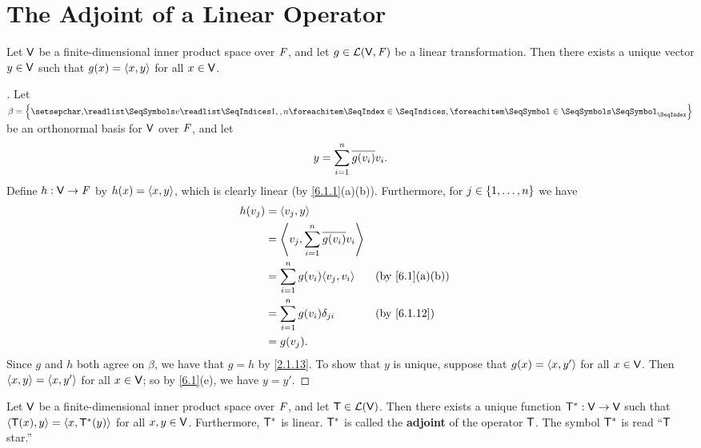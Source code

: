 \section{The Adjoint of a Linear Operator}\label{sec:6.3}

\begin{thm}\label{6.8}
  Let \(\mathsf{V}\) be a finite-dimensional inner product space over \(\mathit{F}\), and let \(g \in \mathcal{L}(\mathsf{V}, \mathit{F})\) be a linear transformation.
  Then there exists a unique vector \(y \in \mathsf{V}\) such that \(g(x) = \left\langle x, y\right\rangle\) for all \(x \in \mathsf{V}\).
\end{thm}

\begin{proof}[]
  Let \(\beta = \set{\seq{v}{1,,n}}\) be an orthonormal basis for \(\mathsf{V}\) over \(\mathit{F}\), and let
  \[
    y = \sum_{i = 1}^n \overline{g(v_i)} v_i.
  \]
  Define \(h : \mathsf{V} \to \mathit{F}\) by \(h(x) = \left\langle x, y\right\rangle\), which is clearly linear (by \cref{6.1.1}(a)(b)).
  Furthermore, for \(j \in \left\lbrace1, \dots, n\right\rbrace\) we have
  \begin{align*}
    h(v_j) & = \inn{v_j, y}                                                                  \\
           & = \inn{v_j, \sum_{i = 1}^n \conj{g(v_i)} v_i}                                   \\
           & = \sum_{i = 1}^n g(v_i) \inn{v_j, v_i}        &  & \text{(by \cref{6.1}(a)(b))} \\
           & = \sum_{i = 1}^n g(v_i) \delta_{j i}          &  & \text{(by \cref{6.1.12})}    \\
           & = g(v_j).
  \end{align*}
  Since \(g\) and \(h\) both agree on \(\beta\), we have that \(g = h\) by \cref{2.1.13}.
  To show that \(y\) is unique, suppose that \(g(x) = \left\langle x, y'\right\rangle\) for all \(x \in \mathsf{V}\).
  Then \(\left\langle x, y\right\rangle = \left\langle x, y'\right\rangle\) for all \(x \in \mathsf{V}\);
  so by \cref{6.1}(e), we have \(y = y'\).
\end{proof}

\begin{thm}\label{6.9}
  Let \(\mathsf{V}\) be a finite-dimensional inner product space over \(\mathit{F}\), and let \(\mathsf{T} \in \mathcal{L}(\mathsf{V})\).
  Then there exists a unique function \(\mathsf{T}^* : \mathsf{V} \to \mathsf{V}\) such that \(\left\langle\mathsf{T}(x), y\right\rangle = \left\langle x, \mathsf{T}^*(y)\right\rangle\) for all \(x, y \in \mathsf{V}\).
  Furthermore, \(\mathsf{T}^*\) is linear.
  \(\mathsf{T}^*\) is called the \textbf{adjoint} of the operator \(\mathsf{T}\).
  The symbol \(\mathsf{T}^*\) is read ``\(\mathsf{T}\) star.''
\end{thm}

